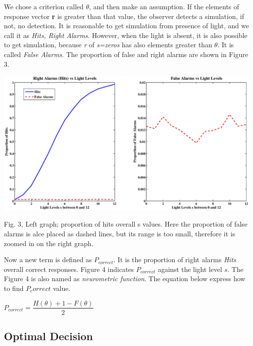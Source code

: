 \documentclass{article}
\begin{document}
We chose a criterion called $\theta$, and then make an assumption. If the elements of response vector \textbf{r} is greater than that value, the observer detects a simulation, if not, no detection. It is reasonable to get simulation from presence of light, and we call it as \textit{Hits, Right Alarms}. However, when the light is absent, it is also possible to get simulation, because \textit{r} of \textit{s=zeros} has also elements greater than $\theta$. It is called \textit{False Alarms}. The proportion of false and right alarms are shown in Figure 3. 

 \begin{center}
 \includegraphics[width=\textwidth]{hits_false.eps}
\begin{footnotesize} Fig. 3, Left graph; proportion of hits overall s values. Here the proportion of false alarms is alce placed as dashed lines, but its range is too small, therefore it is zoomed in on the right graph.
\end{footnotesize}
\end{center}

Now a new term is defined as \textit{$P_{correct}$}. It is the proportion of right alarms \textit{Hits} overall correct responses. Figure 4 indicates $P_{correct}$ against the light level $s$. The Figure 4 is also named as \textit{neurometric function}. The equation below express how to find ${P_correct}$ value.\\

\begin{center}
$P_{correct}=\dfrac{H(\theta)+1-F(\theta)}{2}$
\end{center}

\subsection{Optimal Decision}
\end{document}
